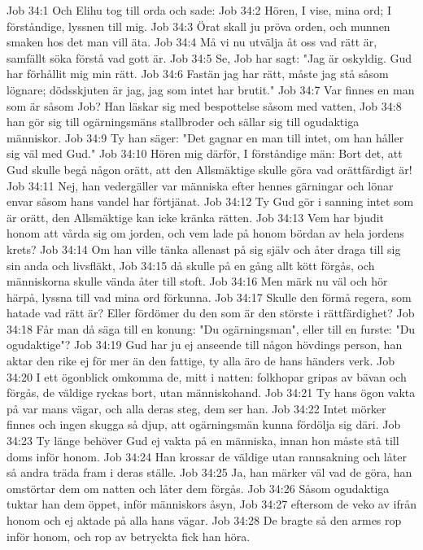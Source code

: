 Job 34:1  Och Elihu tog till orda och sade:
Job 34:2  Hören, I vise, mina ord; I förståndige, lyssnen till mig.
Job 34:3  Örat skall ju pröva orden, och munnen smaken hos det man vill äta.
Job 34:4  Må vi nu utvälja åt oss vad rätt är, samfällt söka förstå vad gott är.
Job 34:5  Se, Job har sagt: "Jag är oskyldig. Gud har förhållit mig min rätt.
Job 34:6  Fastän jag har rätt, måste jag stå såsom lögnare; dödsskjuten är jag, jag som intet har brutit."
Job 34:7  Var finnes en man som är såsom Job? Han läskar sig med bespottelse såsom med vatten,
Job 34:8  han gör sig till ogärningsmäns stallbroder och sällar sig till ogudaktiga människor.
Job 34:9  Ty han säger: "Det gagnar en man till intet, om han håller sig väl med Gud."
Job 34:10  Hören mig därför, I förståndige män: Bort det, att Gud skulle begå någon orätt, att den Allsmäktige skulle göra vad orättfärdigt är!
Job 34:11  Nej, han vedergäller var människa efter hennes gärningar och lönar envar såsom hans vandel har förtjänat.
Job 34:12  Ty Gud gör i sanning intet som är orätt, den Allsmäktige kan icke kränka rätten.
Job 34:13  Vem har bjudit honom att vårda sig om jorden, och vem lade på honom bördan av hela jordens krets?
Job 34:14  Om han ville tänka allenast på sig själv och åter draga till sig sin anda och livsfläkt,
Job 34:15  då skulle på en gång allt kött förgås, och människorna skulle vända åter till stoft.
Job 34:16  Men märk nu väl och hör härpå, lyssna till vad mina ord förkunna.
Job 34:17  Skulle den förmå regera, som hatade vad rätt är? Eller fördömer du den som är den störste i rättfärdighet?
Job 34:18  Får man då säga till en konung: "Du ogärningsman", eller till en furste: "Du ogudaktige"?
Job 34:19  Gud har ju ej anseende till någon hövdings person, han aktar den rike ej för mer än den fattige, ty alla äro de hans händers verk.
Job 34:20  I ett ögonblick omkomma de, mitt i natten: folkhopar gripas av bävan och förgås, de väldige ryckas bort, utan människohand.
Job 34:21  Ty hans ögon vakta på var mans vägar, och alla deras steg, dem ser han.
Job 34:22  Intet mörker finnes och ingen skugga så djup, att ogärningsmän kunna fördölja sig däri.
Job 34:23  Ty länge behöver Gud ej vakta på en människa, innan hon måste stå till doms inför honom.
Job 34:24  Han krossar de väldige utan rannsakning och låter så andra träda fram i deras ställe.
Job 34:25  Ja, han märker väl vad de göra, han omstörtar dem om natten och låter dem förgås.
Job 34:26  Såsom ogudaktiga tuktar han dem öppet, inför människors åsyn,
Job 34:27  eftersom de veko av ifrån honom och ej aktade på alla hans vägar.
Job 34:28  De bragte så den armes rop inför honom, och rop av betryckta fick han höra.
